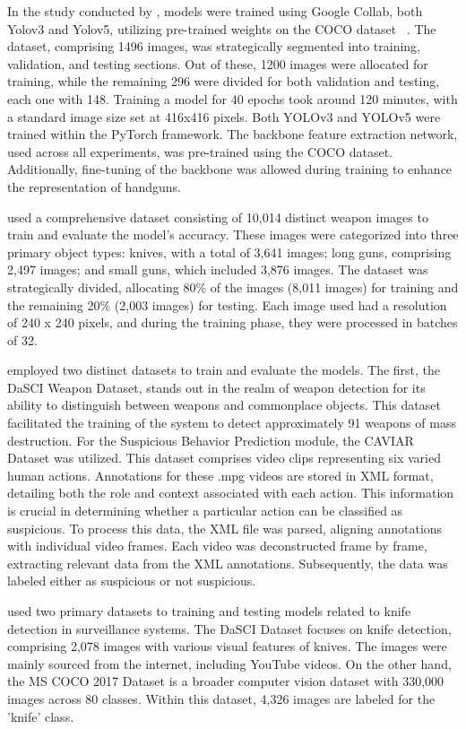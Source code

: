 In the study conducted by \citet{rfc5}, models were trained using Google Collab, both Yolov3 and Yolov5, utilizing pre-trained weights on the COCO dataset ~\cite{rfc16}. The dataset, comprising 1496 images, was strategically segmented into training, validation, and testing sections. Out of these, 1200 images were allocated for training, while the remaining 296 were divided for both validation and testing, each one with 148. Training a model for 40 epochs took around 120 minutes, with a standard image size set at 416x416 pixels. Both YOLOv3 and YOLOv5 were trained within the PyTorch framework. The backbone feature extraction network, used across all experiments, was pre-trained using the COCO dataset. Additionally, fine-tuning of the backbone was allowed during training to enhance the representation of handguns.

\citet{rfc6} used a comprehensive dataset consisting of 10,014 distinct weapon images to train and evaluate the model's accuracy. These images were categorized into three primary object types: knives, with a total of 3,641 images; long guns, comprising 2,497 images; and small guns, which included 3,876 images. The dataset was strategically divided, allocating 80\% of the images (8,011 images) for training and the remaining 20\% (2,003 images) for testing. Each image used had a resolution of 240 x 240 pixels, and during the training phase, they were processed in batches of 32.

\citet{rfc7} employed two distinct datasets to train and evaluate the models. The first, the DaSCI Weapon Dataset, stands out in the realm of weapon detection for its ability to distinguish between weapons and commonplace objects. This dataset facilitated the training of the system to detect approximately 91 weapons of mass destruction. For the Suspicious Behavior Prediction module, the CAVIAR Dataset was utilized. This dataset comprises video clips representing six varied human actions. Annotations for these .mpg videos are stored in XML format, detailing both the role and context associated with each action. This information is crucial in determining whether a particular action can be classified as suspicious. To process this data, the XML file was parsed, aligning annotations with individual video frames. Each video was deconstructed frame by frame, extracting relevant data from the XML annotations. Subsequently, the data was labeled either as suspicious or not suspicious. 

\citet{rfc18} used two primary datasets to training and testing models related to knife detection in surveillance systems. The DaSCI Dataset focuses on knife detection, comprising 2,078 images with various visual features of knives. The images were mainly sourced from the internet, including YouTube videos. On the other hand, the MS COCO 2017 Dataset is a broader computer vision dataset with 330,000 images across 80 classes. Within this dataset, 4,326 images are labeled for the 'knife' class.

